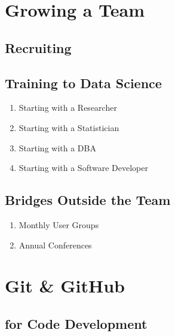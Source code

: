 \documentclass[]{book}
\providecommand{\tightlist}{%
  \setlength{\itemsep}{0pt}\setlength{\parskip}{0pt}}
\begin{document}
\hypertarget{team}{%
\chapter{Growing a Team}\label{team}}

\hypertarget{recruiting}{%
\section{Recruiting}\label{recruiting}}

\hypertarget{training-to-data-science}{%
\section{Training to Data Science}\label{training-to-data-science}}

\begin{enumerate}
\def\labelenumi{\arabic{enumi}.}
\tightlist
\item
  Starting with a Researcher
\item
  Starting with a Statistician
\item
  Starting with a DBA
\item
  Starting with a Software Developer
\end{enumerate}

\hypertarget{bridges-outside-the-team}{%
\section{Bridges Outside the Team}\label{bridges-outside-the-team}}

\begin{enumerate}
\def\labelenumi{\arabic{enumi}.}
\tightlist
\item
  Monthly User Groups
\item
  Annual Conferences
\end{enumerate}

\cleardoublepage

\hypertarget{appendix-appendix}{%
\appendix}


\hypertarget{git-github}{%
\chapter{Git \& GitHub}\label{git-github}}

\hypertarget{for-code-development}{%
\section{for Code Development}\label{for-code-development}}
\end{document}
